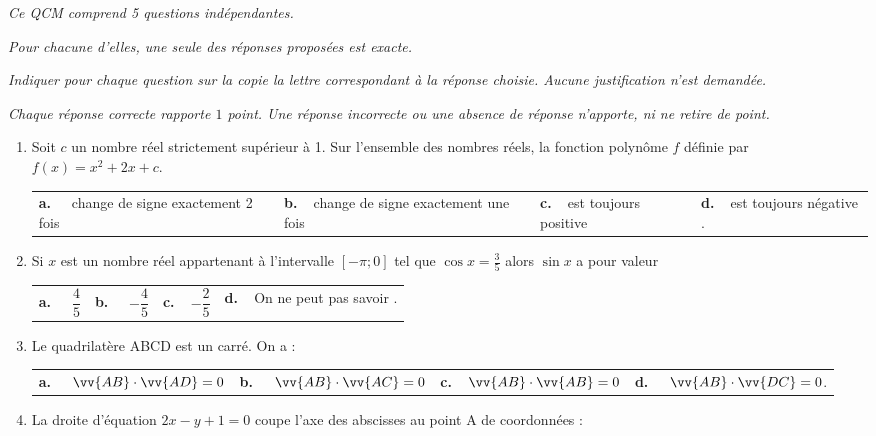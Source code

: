 \medskip

\emph{Ce QCM comprend 5 questions indépendantes.}

\emph{Pour chacune d'elles, une seule des réponses proposées est exacte.}

\emph{Indiquer pour chaque question sur la copie la lettre correspondant à la réponse
choisie. Aucune justification n'est demandée.}

\emph{Chaque réponse correcte rapporte $1$ point. Une réponse incorrecte ou une absence de
réponse n'apporte, ni ne retire de point.}

\medskip

\begin{enumerate}
\item  Soit $c$ un nombre réel strictement supérieur à 1. Sur l'ensemble des nombres réels, la
fonction polynôme $f$ définie par $f(x) = x^2 + 2x + c$.

\begin{center}
\begin{tabularx}{\linewidth}{*{4}{X}}
\textbf{a.~~}  change de signe exactement 2 fois &\textbf{b.~~}change de signe exactement une fois &\textbf{c.~~}est toujours positive& \textbf{d.~~}est toujours négative .
\end{tabularx}
\end{center}
\item Si $x$ est un nombre réel appartenant à l'intervalle $[ - \pi ; 0] $ tel que $\cos x =\frac{3}{5}$
 alors $\sin x$ a pour valeur 

\begin{center}
\begin{tabularx}{\linewidth}{*{4}{X}}
\textbf{a.~~} $\dfrac{4}{5}$ &\textbf{b.~~} $-\dfrac{4}{5}$&\textbf{c.~~}$ -\dfrac{2}{5}$& \textbf{d.~~}On ne peut pas savoir .
\end{tabularx}
\end{center}

\item Le quadrilatère ABCD est un carré. On a :

\begin{center}
\begin{tabularx}{\linewidth}{*{4}{X}}
\textbf{a.~~} $\vv{AB}\cdot\vv{AD}= 0$ &\textbf{b.~~} $\vv{AB}\cdot\vv{AC}= 0$&\textbf{c.~~}$ \vv{AB}\cdot\vv{AB}= 0$& \textbf{d.~~} $\vv{AB}\cdot\vv{DC} = 0$.
\end{tabularx}
\end{center}


\item La droite d'équation $2x - y + 1 = 0$ coupe l'axe des abscisses au point A de
coordonnées :


\end{enumerate}
